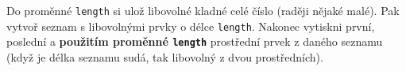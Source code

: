 \question[50]
Do proměnné \texttt{length} si ulož libovolné kladné celé číslo (raději nějaké
malé). Pak vytvoř seznam s libovolnými prvky o délce \texttt{length}. Nakonec
vytiskni první, poslední a \textbf{použitím proměnné \texttt{length}} prostřední
prvek z daného seznamu (když je délka seznamu sudá, tak libovolný z dvou prostředních).